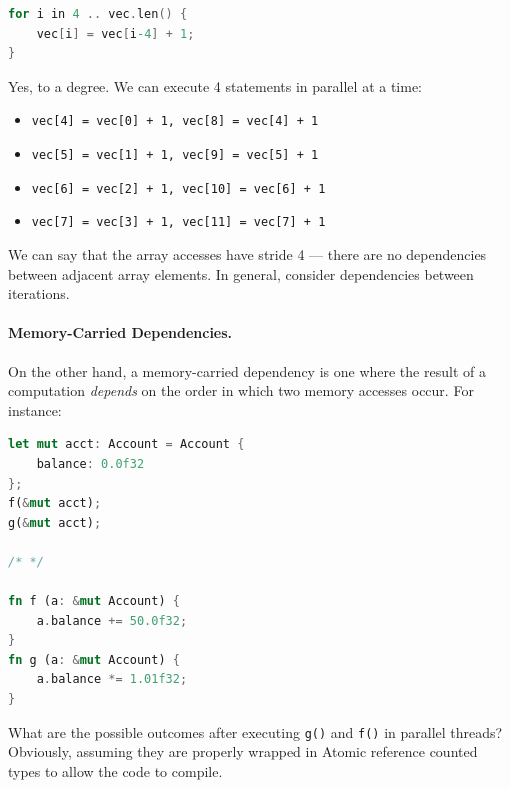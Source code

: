 \documentclass[a4paper]{report}
\begin{document}
\begin{lstlisting}[language=C]
for i in 4 .. vec.len() {
    vec[i] = vec[i-4] + 1;
}
\end{lstlisting}

Yes, to a degree. We can execute 4 statements in parallel at a time:
\begin{itemize}
  \item \texttt{vec[4] = vec[0] + 1, vec[8] = vec[4] + 1}
  \item \texttt{vec[5] = vec[1] + 1, vec[9] = vec[5] + 1}
  \item \texttt{vec[6] = vec[2] + 1, vec[10] = vec[6] + 1}
  \item \texttt{vec[7] = vec[3] + 1, vec[11] = vec[7] + 1}
\end{itemize}  
We can say that the array accesses have stride 4 --- there are no
dependencies between adjacent array elements. In general, consider
dependencies between iterations.


\paragraph{Memory-Carried Dependencies.} On the other hand, a memory-carried dependency is one where the result
of a computation \emph{depends} on the order in which two memory accesses
occur. For instance:

{\small \begin{lstlisting}[language=Rust]
let mut acct: Account = Account {
    balance: 0.0f32
};
f(&mut acct);
g(&mut acct);

/* */

fn f (a: &mut Account) {
    a.balance += 50.0f32;
}
fn g (a: &mut Account) {
    a.balance *= 1.01f32;
}
\end{lstlisting} }

{\sf What are the possible outcomes after executing {\tt g()} and {\tt f()}
in parallel threads? Obviously, assuming they are properly wrapped in Atomic reference counted types to allow the code to compile.} \\[1em]
\end{document}
